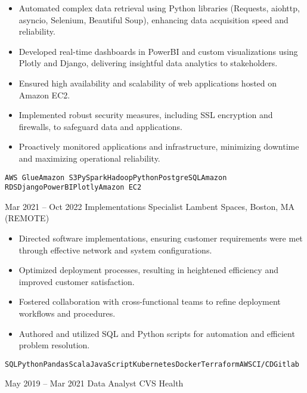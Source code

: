 \documentclass[9pt]{developercv} %
\begin{document}
\begin{entrylist}
{\begin{itemize}
            \item Automated complex data retrieval using Python libraries (Requests, aiohttp, asyncio, Selenium, Beautiful Soup), enhancing data acquisition speed and reliability.
            \item Developed real-time dashboards in PowerBI and custom visualizations using Plotly and Django, delivering insightful data analytics to stakeholders.
            \item Ensured high availability and scalability of web applications hosted on Amazon EC2.
            \item Implemented robust security measures, including SSL encryption and firewalls, to safeguard data and applications.
            \item Proactively monitored applications and infrastructure, minimizing downtime and maximizing operational reliability.
        \end{itemize}
        \texttt{AWS Glue}\slashsep\texttt{Amazon S3}\slashsep\texttt{PySpark}\slashsep\texttt{Hadoop}\slashsep\texttt{Python}\slashsep\texttt{PostgreSQL}\slashsep\texttt{Amazon RDS}\slashsep\texttt{Django}\slashsep\texttt{PowerBI}\slashsep\texttt{Plotly}\slashsep\texttt{Amazon EC2}
        }
    \entry
        { Mar 2021 -- Oct 2022 }
        { Implementations Specialist}
        {Lambent Spaces, Boston, MA (REMOTE)}
        {
        \begin{itemize}
            \item Directed software implementations, ensuring customer requirements were met through effective network and system configurations.
            \item Optimized deployment processes, resulting in heightened efficiency and improved customer satisfaction.
            \item Fostered collaboration with cross-functional teams to refine deployment workflows and procedures.
            \item Authored and utilized SQL and Python scripts for automation and efficient problem resolution.
        \end{itemize}
        \texttt{SQL}\slashsep\texttt{Python}\slashsep\texttt{Pandas}\slashsep\texttt{Scala}\slashsep\texttt{JavaScript}\slashsep\texttt{Kubernetes}\slashsep\texttt{Docker}\slashsep\texttt{Terraform}\slashsep\texttt{AWS}\slashsep\texttt{CI/CD}\slashsep\texttt{Gitlab}
        }
    \entry
        {May 2019 -- Mar 2021}
        { Data Analyst}
        {CVS Health}
        {
        \begin{itemize}

\end{itemize}}
\end{entrylist}
\end{document}
